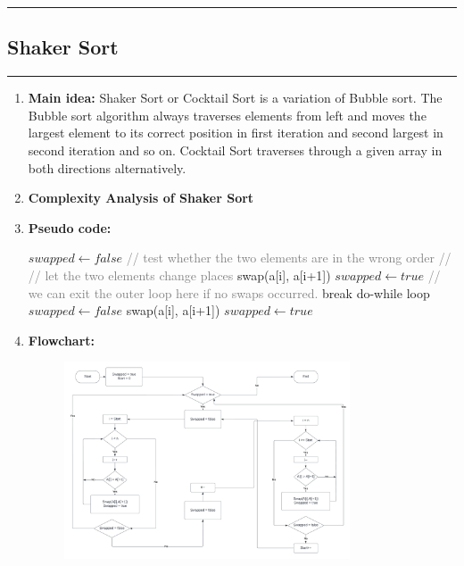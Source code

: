 \documentclass[11pt,a4paper]{article}
\begin{document}
{		\rule{15cm}{0.1cm}
		\subsection{Shaker Sort}
		\rule{15cm}{0.1cm}
			\begin{enumerate}[label=\textbf{\arabic*})]
				\item \textbf{Main idea:}
				Shaker Sort or Cocktail Sort is a variation of Bubble sort. The Bubble sort algorithm always traverses elements from left and moves the largest element to its correct position in first iteration and second largest in second iteration and so on. Cocktail Sort traverses through a given array in both directions alternatively. 
				\\[12pt]
				\item \textbf{Complexity Analysis of Shaker Sort}
				\\[12pt]
				\item \textbf{Pseudo code:} 
				\begin{algorithm}
            	\begin{algorithmic}[1]
            			\Do
            				\State $swapped \gets false$
            					\State \textcolor{gray}{// test whether the two elements are in the wrong order}
            						\State \textcolor{gray}{// // let the two elements change places}
            						\State swap(a[i], a[i+1])
            						\State $swapped \gets true$
            					\EndIf
            				\EndFor
            					\State \textcolor{Gray}{// we can exit the outer loop here if no swaps occurred.}
            					\State break do-while loop
            				\EndIf
            				\State $swapped \gets false$
            						\State swap(a[i], a[i+1])
            						\State $swapped \gets true$
            					\EndIf
            				\EndFor
            			 \Comment{\textcolor{Gray}{// if no elements have been swapped, then the list is sorted}}
            		\EndProcedure
            	\end{algorithmic}
            \end{algorithm}
				\item \textbf{Flowchart:}
					\begin{figure}[H]
						\centering 
						\includegraphics[width=0.8\textwidth]{Shaker Sort}

\end{figure}
\end{enumerate}}
\end{document}
